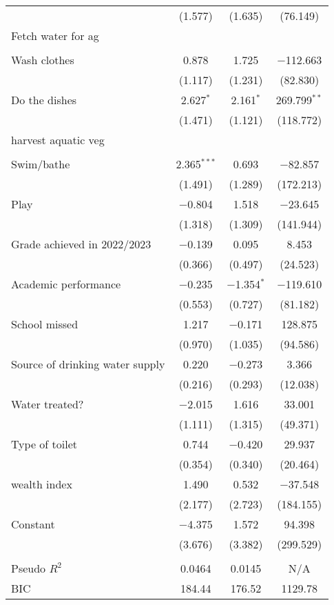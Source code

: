 \begin{table}[!htbp]
\begin{tabular}{@{\extracolsep{3pt}}lccc}
  & (1.577) & (1.635) & (76.149) \\ 
  Fetch water for ag &  &  &  \\ 
  &  &  &  \\ 
  Wash clothes & 0.878 & 1.725 & $-$112.663 \\ 
  & (1.117) & (1.231) & (82.830) \\ 
  Do the dishes & 2.627$^{*}$ & 2.161$^{*}$ & 269.799$^{**}$ \\ 
  & (1.471) & (1.121) & (118.772) \\ 
  harvest aquatic veg &  &  &  \\ 
  &  &  &  \\ 
  Swim/bathe & 2.365$^{***}$ & 0.693 & $-$82.857 \\ 
  & (1.491) & (1.289) & (172.213) \\ 
  Play & $-$0.804 & 1.518 & $-$23.645 \\ 
  & (1.318) & (1.309) & (141.944) \\ 
  Grade achieved in 2022/2023 & $-$0.139 & 0.095 & 8.453 \\ 
  & (0.366) & (0.497) & (24.523) \\ 
  Academic performance & $-$0.235 & $-$1.354$^{*}$ & $-$119.610 \\ 
  & (0.553) & (0.727) & (81.182) \\ 
  School missed & 1.217 & $-$0.171 & 128.875 \\ 
  & (0.970) & (1.035) & (94.586) \\ 
  Source of drinking water supply & 0.220 & $-$0.273 & 3.366 \\ 
  & (0.216) & (0.293) & (12.038) \\ 
  Water treated? & $-$2.015 & 1.616 & 33.001 \\ 
  & (1.111) & (1.315) & (49.371) \\ 
  Type of toilet & 0.744 & $-$0.420 & 29.937 \\ 
  & (0.354) & (0.340) & (20.464) \\ 
  wealth index & 1.490 & 0.532 & $-$37.548 \\ 
  & (2.177) & (2.723) & (184.155) \\ 
  Constant & $-$4.375 & 1.572 & 94.398 \\ 
  & (3.676) & (3.382) & (299.529) \\ 
 \hline \\[-1.8ex] 
Pseudo $R^2$ & 0.0464 & 0.0145 & N/A \\ 
BIC & 184.44 & 176.52 & 1129.78 \\ 

\end{tabular}
\end{table}
